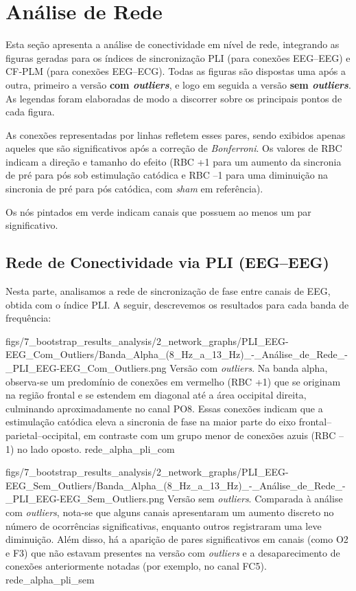 \chapter{Análise de Rede}
Esta seção apresenta a análise de conectividade em nível de rede, integrando as figuras geradas para os índices de sincronização PLI (para conexões EEG–EEG) e CF‐PLM (para conexões EEG–ECG). Todas as figuras são dispostas uma após a outra, primeiro a versão \textbf{com \textit{outliers}}, e logo em seguida a versão \textbf{sem \textit{outliers}}. As legendas foram elaboradas de modo a discorrer sobre os principais pontos de cada figura. 

As conexões representadas por linhas refletem esses pares, sendo exibidos apenas aqueles que são significativos após a correção de \textit{Bonferroni}. Os valores de RBC indicam a direção e tamanho do efeito (RBC +1 para um aumento da sincronia de pré para pós sob estimulação catódica e RBC –1 para uma diminuição na sincronia de pré para pós catódica, com \textit{sham} em referência).

Os nós pintados em verde indicam canais que possuem ao menos um par significativo.

\section{Rede de Conectividade via PLI (EEG–EEG)}
Nesta parte, analisamos a rede de sincronização de fase entre canais de EEG, obtida com o índice PLI.  A seguir, descrevemos os resultados para cada banda de frequência:

\smallfigure
{figs/7_bootstrap_results_analysis/2_network_graphs/PLI_EEG-EEG_Com_Outliers/Banda_Alpha_(8_Hz_a_13_Hz)_-_Análise_de_Rede_-_PLI_EEG-EEG_Com_Outliers.png}
{Versão com \textit{outliers}. Na banda alpha, observa-se um predomínio de conexões em vermelho (RBC +1) que se originam na região frontal e se estendem em diagonal até a área occipital direita, culminando aproximadamente no canal PO8. Essas conexões indicam que a estimulação catódica eleva a sincronia de fase na maior parte do eixo frontal–parietal–occipital, em contraste com um grupo menor de conexões azuis (RBC –1) no lado oposto.}
{rede_alpha_pli_com}

\smallfigure
{figs/7_bootstrap_results_analysis/2_network_graphs/PLI_EEG-EEG_Sem_Outliers/Banda_Alpha_(8_Hz_a_13_Hz)_-_Análise_de_Rede_-_PLI_EEG-EEG_Sem_Outliers.png}
{Versão sem \textit{outliers}. Comparada à análise com \textit{outliers}, nota-se que alguns canais apresentaram um aumento discreto no número de ocorrências significativas, enquanto outros registraram uma leve diminuição. Além disso, há a aparição de pares significativos em canais (como O2 e F3) que não estavam presentes na versão com \textit{outliers} e a desaparecimento de conexões anteriormente notadas (por exemplo, no canal FC5).}
{rede_alpha_pli_sem}

